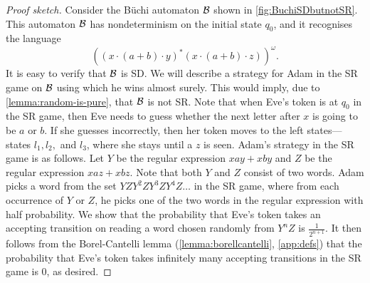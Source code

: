 \begin{proof}[Proof sketch]
    Consider the B\"uchi automaton $\mathcal{B}$ shown in \cref{fig:BuchiSDbutnotSR}. This automaton $\mathcal{B}$ has nondeterminism on the initial state $q_0$, and it recognises the language $$((x \cdot (a+b)\cdot y)^{*}(x\cdot (a+b)\cdot z))^{\omega}.$$ 
    It is easy to verify that $\mathcal{B}$ is SD. We will describe a strategy for Adam in the SR game on $\mathcal{B}$ using which he wins almost surely. This would imply, due to \cref{lemma:random-is-pure}, that $\mathcal{B}$ is not SR. Note that when Eve's token is at $q_0$ in the SR game, then Eve needs to guess whether the next letter after $x$ is going to be $a$ or $b$. If she guesses incorrectly, then her token moves to the left states---states $l_1,l_2,$ and $l_3$, where she stays until a $z$ is seen. Adam's strategy in the SR game is as follows. Let $Y$ be the regular expression $xay+xby$ and $Z$ be the regular expression $xaz+xbz$. Note that both $Y$ and $Z$ consist of two words. Adam picks a word from the set $YZY^2ZY^3ZY^4Z \dots$ in the SR game, where from each occurrence of $Y$ or $Z$, he picks one of the two words in the regular expression with half probability. We show that the probability that Eve's token takes an accepting transition on reading a word chosen randomly from $Y^{n}Z$ is $\frac{1}{2^{n+1}}$. It then follows from the Borel-Cantelli lemma (\cref{lemma:borellcantelli}, \cref{app:defs}) that the probability that Eve's token takes infinitely many accepting transitions in the SR game is 0, as desired. 
\end{proof}

